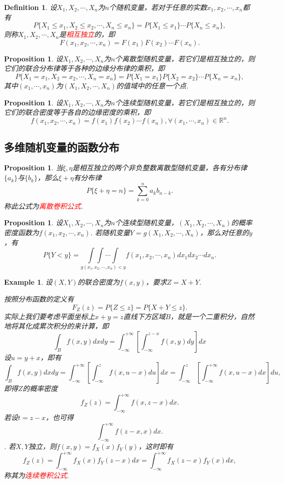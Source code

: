 \documentclass{article}
\newtheorem{proposition}[theorem]{Proposition}
\newtheorem{example}[theorem]{Example}
\newtheorem{definition}[theorem]{Definition}
\newcommand{\redt}[1]{\textcolor{red}{#1}}
\begin{document}
\begin{definition}
\rm 设$X_1,X_2,\cdots,X_n$为$n$个随机变量，若对于任意的实数$x_1,x_2,\cdots,x_n$都有
$$
P\{X_1 \leq x_1, X_2 \leq x_2 ,\cdots, X_n \leq x_n\} = P\{X_1 \leq x_1\} \cdots P\{X_n \leq x_n\},
$$
则称$X_1,X_2,\cdots,X_n$是\redt{相互独立}的，即
$$
F(x_1,x_2,\cdots,x_n) = F(x_1)F(x_2)\cdots F(x_n). 
$$
\end{definition}

\begin{proposition}
\rm 设$X_1,X_2,\cdots,X_n$为$n$个离散型随机变量，若它们是相互独立的，则它们的联合分布律等于各种的边缘分布律的乘积，即
$$
P\{X_1 = x_1, X_2 = x_2 , \cdots, X_n = x_n\} = P\{X_1 = x_1\}P\{X_2 = x_2\}\cdots P\{X_n = x_n\},
$$
其中$(x_1,\cdots,x_n)$为$(X_1,X_2,\cdots,X_n)$的值域中的任意一个点. 
\end{proposition}

\begin{proposition}
\rm 设$X_1,X_2,\cdots,X_n$为$n$个连续型随机变量，若它们是相互独立的，则它们的联合密度等于各自的边缘密度的乘积，即
$$
f(x_1,x_2,\cdots,x_n) = f(x_1)f(x_2)\cdots f(x_n), \forall (x_1,\cdots,x_n) \in \mathbb{R}^n.
$$
\end{proposition}

\subsection{多维随机变量的函数分布}

\begin{proposition}
\rm 当$\xi,\eta$是相互独立的两个非负整数离散型随机变量，各有分布律$\{a_k\}$与$\{b_k\}$，那么$\xi+\eta$有分布律
$$
P\{\xi+\eta = n\} = \sum\limits_{k=0}^n a_kb_{n-k}. 
$$
称此公式为\redt{离散卷积公式}.
\end{proposition}

\begin{proposition}
\rm 设$X_1,X_2,\cdots,X_n$为$n$个连续型随机变量，$(X_1,X_2,\cdots,X_n)$的概率密度函数为$f(x_1,x_2,\cdots,x_n)$. 若随机变量$Y=g(X_1,X_2,\cdots,X_n)$，那么对任意的$y$，有
$$
P\{Y < y\} = \underset{g(x_1,x_2,\cdots,x_n) < y}{\int\int\cdots\int}f(x_1,x_2,\cdots,x_n)dx_1dx_2\cdots dx_n.
$$
\end{proposition}

\begin{example}
\rm 设$(X,Y)$的联合密度为$f(x,y)$，要求$Z=X+Y$.

按照分布函数的定义有
$$
F_Z(z)=P\{Z \leq z\} = P\{X+Y \leq z\}.
$$
实际上我们要考虑平面坐标上$x+y=z$直线下方区域$B$，就是一个二重积分，自然地将其化成累次积分的来计算，即
$$
\int_{B} f(x,y)dxdy = \int_{-\infty}^{+\infty}\left[ \int_{-\infty}^{z-x} f(x,y)dy \right] dx
$$
设$u = y+x$，即有
$$
\int_{B} f(x,y)dxdy = \int_{-\infty}^{+\infty}\left[ \int_{-\infty}^{z} f(x,u-x)du \right] dx = \int_{-\infty}^{z} \left[ \int_{-\infty}^{+\infty} f(x,u-x)dx \right] du, 
$$
即得$Z$的概率密度
$$
f_Z(z) = \int_{-\infty}^{+\infty} f(x,z-x)dx.
$$
若设$t=z-x$，也可得
$$
\int_{-\infty}^{+\infty} f(z-x,x)dx.
$$.
若$X,Y$独立，则$f(x,y)=f_X(x)f_Y(y)$，这时即有
$$
f_Z(z) = \int_{-\infty}^{+\infty} f_X(x)f_Y(z-x)dx = \int_{-\infty}^{+\infty} f_X(z-x)f_Y(x)dx,
$$
称其为\redt{连续卷积公式}. 
\end{example}
\end{document}
